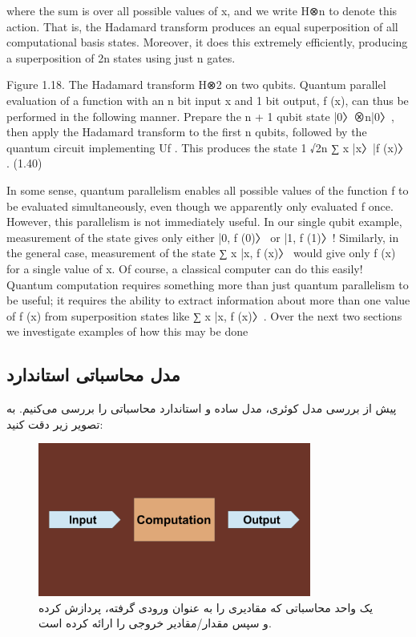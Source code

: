 \documentclass{book}
\begin{document}
where the sum is over all possible values of x, and we write H⊗n to denote this action.
That is, the Hadamard transform produces an equal superposition of all computational
basis states. Moreover, it does this extremely efficiently, producing a superposition of 2n
states using just n gates.



Figure 1.18. The Hadamard transform H⊗2 on two qubits.
Quantum parallel evaluation of a function with an n bit input x and 1 bit output, f (x),
can thus be performed in the following manner. Prepare the n + 1 qubit state |0〉⊗n|0〉,
then apply the Hadamard transform to the first n qubits, followed by the quantum circuit
implementing Uf . This produces the state
1
√2n
∑
x
|x〉|f (x)〉 . (1.40)






In some sense, quantum parallelism enables all possible values of the function f to be
evaluated simultaneously, even though we apparently only evaluated f once. However,
this parallelism is not immediately useful. In our single qubit example, measurement of the
state gives only either |0, f (0)〉 or |1, f (1)〉! Similarly, in the general case, measurement of
the state ∑
x |x, f (x)〉 would give only f (x) for a single value of x. Of course, a classical
computer can do this easily! Quantum computation requires something more than just
quantum parallelism to be useful; it requires the ability to extract information about more
than one value of f (x) from superposition states like ∑
x |x, f (x)〉. Over the next two
sections we investigate examples of how this may be done








\newpage
\subsection{مدل محاسباتی استاندارد}
پیش از بررسی مدل کوئری،‌ مدل ساده و استاندارد محاسباتی را بررسی می‌کنیم. به تصویر زیر دقت کنید:

\begin{figure}[ht]
	\centering
	\includegraphics[width=0.8\textwidth]{standard computation model.png}
	\caption{یک واحد محاسباتی که مقادیری را به عنوان ورودی گرفته، پردازش کرده و سپس مقدار/مقادیر خروجی را ارائه کرده است.}
\end{figure}
\end{document}
